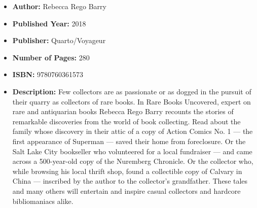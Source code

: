\documentclass{tufte-handout}
\begin{document}
\begin{itemize}
    \item[] \textbf{Author:} Rebecca Rego Barry
    \item[] \textbf{Published Year:} 2018
    \item[] \textbf{Publisher:} Quarto/Voyageur
    \item[] \textbf{Number of Pages:} 280   
    \item[] \textbf{ISBN:} 9780760361573
    \item[] \textbf{Description:} Few collectors are as passionate or as dogged in the pursuit of their quarry as collectors of rare books. In Rare Books Uncovered, expert on rare and antiquarian books Rebecca Rego Barry recounts the stories of remarkable discoveries from the world of book collecting. Read about the family whose discovery in their attic of a copy of Action Comics No. 1 --- the first appearance of Superman --- saved their home from foreclosure. Or the Salt Lake City bookseller who volunteered for a local fundraiser --- and came across a 500-year-old copy of the Nuremberg Chronicle. Or the collector who, while browsing his local thrift shop, found a collectible copy of Calvary in China --- inscribed by the author to the collector's grandfather. These tales and many others will entertain and inspire casual collectors and hardcore bibliomaniacs alike.
\end{itemize}
\end{document}
